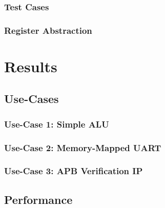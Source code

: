 \documentclass[12pt]{report}
\begin{document}
\subsection{Test Cases} %

\subsection{Register Abstraction} %

\chapter{Results} %

\section{Use-Cases} %

\subsection{Use-Case 1: Simple ALU} %

\subsection{Use-Case 2: Memory-Mapped UART} %

\subsection{Use-Case 3: APB Verification IP} %

\section{Performance} %
\end{document}
